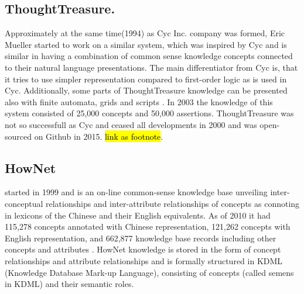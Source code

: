\subsection{ThoughtTreasure.} Approximately at the same time(1994) as Cyc Inc. company
was formed, Eric Mueller started to work on a similar system, which was inspired
by Cyc and is similar in having a combination of common sense knowledge concepts
connected to their natural language presentations. The main differentiator from 
Cyc is, that it tries to use simpler representation compared to first-order 
logic as is used in Cyc. Additionally, some parts of ThoughtTreasure knowledge 
can be presented also with finite automata, grids and scripts 
\parencite{Mueller1999,Mueller2003}. In 2003 the knowledge of this system 
consisted of 25,000 concepts and 50,000 assertions. ThoughtTreasure was not so 
successfull as Cyc and ceased all developments in 2000 and was open-sourced on 
Github in 2015. \hl{link as footnote}.

\subsection{HowNet} started in 1999 and is an on-line common-sense knowledge base 
unveiling inter-conceptual relationships and inter-attribute relationships of 
concepts as connoting in lexicons of the Chinese and their English equivalents. 
As of 2010 it had 115,278 concepts annotated with Chinese representation, 
121,262 concepts with English representation, and 662,877 knowledge base records
including other concepts and attributes \parencite{Dong2010}. HowNet knowledge 
is stored in the form of concept relationships and attribute relationships and 
is formally structured in KDML (Knowledge Database Mark-up Language), consisting
of concepts (called semens in KDML) and their semantic roles.
 
